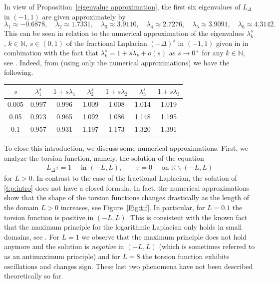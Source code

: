 \documentclass[11 pt]{article}
\numberwithin{equation}{section}
\def\N{\mathbb{N}}
\def\R{\mathbb{R}}
\begin{document}
In view of Proposition~\ref{eigenvalue approximation}, the first six eigenvalues of $L_{\Delta}$ in $(-1,1)$ are given approximately by
\begin{equation*}
\lambda_1\approx -0.6878, \quad \lambda_2\approx 1.7331,\quad \lambda_3\approx 3.9110,\quad \lambda_4\approx 2.7276, \quad \lambda_5\approx 3.9091,\quad \lambda_6\approx 4.3142.
\end{equation*}
This can be seen in relation to the numerical approximation of the eigenvalues $\lambda_{k}^s$, $k\in\N$, $s\in(0,1)$ of the fractional Laplacian $(-\Delta)^s$ in $(-1,1)$ given in \cite{K12} in combination with the fact that  $\lambda_k^s=1+s\lambda_k+o(s)$ as $s\to 0^+$ for any $k\in\N$, see \cite{FJW22}. Indeed, from \cite[Table 1]{K12} (using only the numerical approximations) we have the following.
\begin{center}
\begin{tabular}{c|cc|cc|cc}
$s$ & $\lambda_1^s$ &$1+s\lambda_1$  & $\lambda_2^s$ &$1+s\lambda_2$ & $\lambda_3^s$ &$1+s\lambda_3$\\
\hline
0.005 & 0.997 & 0.996 & 1.009 & 1.008 & 1.014 & 1.019\\
0.05  & 0.973 & 0.965 & 1.092 & 1.086 & 1.148 & 1.195\\
0.1   & 0.957 & 0.931 & 1.197 & 1.173 & 1.320 & 1.391
\end{tabular}
\end{center}

To close this introduction, we discuss some numerical approximations.  First, we analyze the torsion function, namely, the solution of the equation
\begin{align}\label{t:p:intro}
 L_\Delta \tau = 1\quad \text{ in }(-L,L),\qquad \tau=0\quad \text{ on }\R\backslash (-L,L)
\end{align}
for $L>0$.  In contrast to the case of the fractional Laplacian, the solution of \eqref{t:p:intro} does not have a closed formula. In fact, the numerical approximations show that the shape of the torsion functions changes drastically as the length of the domain $L>0$ increases, see Figure~\ref{Fig:t:f}. In particular, for $L=0.1$ the torsion function is positive in $(-L,L)$.  This is consistent with the known fact that the maximum principle for the logarithmic Laplacian only holds in small domains, see \cite[Corollary 1.9]{CW19}. For $L=1$ we observe that the maximum principle does not hold anymore and the solution is \emph{negative} in $(-L,L)$ (which is sometimes referred to as an antimaximum principle) and for $L=8$ the torsion function exhibits oscillations and changes sign. These last two phenomena have not been described theoretically so far.
\end{document}
